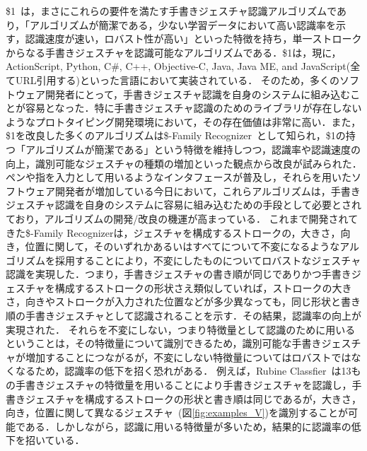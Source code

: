 \$1~\cite{Wobbrock:2007:GWL:1294211.1294238}は，まさにこれらの要件を満たす手書きジェスチャ認識アルゴリズムであり，「アルゴリズムが簡潔である，少ない学習データにおいて高い認識率を示す，認識速度が速い，ロバスト性が高い」といった特徴を持ち，単一ストロークからなる手書きジェスチャを認識可能なアルゴリズムである．\$1は，現に，ActionScript, Python, C\#, C++, Objective-C, Java, Java ME, and JavaScript(全てURL引用する)といった言語において実装されている．
そのため，多くのソフトウェア開発者にとって，手書きジェスチャ認識を自身のシステムに組み込むことが容易となった．特に手書きジェスチャ認識のためのライブラリが存在しないようなプロトタイピング開発環境において，その存在価値は非常に高い．また，\$1を改良した多くのアルゴリズムは\$-Family Recognizer~\cite{Anthony:2010:LMR:1839214.1839258,Reaver:2011:MQU:2021164.2021183,Li:2010:PFA:1753326.1753654,Anthony:2012:NFA:2305276.2305296,Herold:2012:CRF:2331067.2331074,Vatavu:2012:GPC:2388676.2388732,Taranta:2015:PPB:2788890.2788925}として知られ，\$1の持つ「アルゴリズムが簡潔である」という特徴を維持しつつ，認識率や認識速度の向上，識別可能なジェスチャの種類の増加といった観点から改良が試みられた．ペンや指を入力として用いるようなインタフェースが普及し，それらを用いたソフトウェア開発者が増加している今日において，これらアルゴリズムは，手書きジェスチャ認識を自身のシステムに容易に組み込むための手段として必要とされており，アルゴリズムの開発/改良の機運が高まっている．
これまで開発されてきた\$-Family Recognizerは，ジェスチャを構成するストロークの，大きさ，向き，位置に関して，そのいずれかあるいはすべてについて不変になるようなアルゴリズムを採用することにより，不変にしたものについてロバストなジェスチャ認識を実現した．つまり，手書きジェスチャの書き順が同じでありかつ手書きジェスチャを構成するストロークの形状さえ類似していれば，ストロークの大きさ，向きやストロークが入力された位置などが多少異なっても，同じ形状と書き順の手書きジェスチャとして認識されることを示す．その結果，認識率の向上が実現された．
それらを不変にしない，つまり特徴量として認識のために用いるということは，その特徴量について識別できるため，識別可能な手書きジェスチャが増加することにつながるが，不変にしない特徴量についてはロバストではなくなるため，認識率の低下を招く恐れがある．
例えば，Rubine Classfier~\cite{Rubine:1991:SGE:122718.122753}は13もの手書きジェスチャの特徴量を用いることにより手書きジェスチャを認識し，手書きジェスチャを構成するストロークの形状と書き順は同じであるが，大きさ，向き，位置に関して異なるジェスチャ~(図\ref{fig:examples_V})を識別することが可能である．しかしながら，認識に用いる特徴量が多いため，結果的に認識率の低下を招いている．

